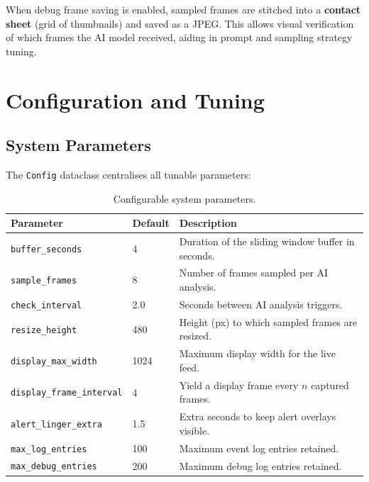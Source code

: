 \documentclass[12pt,a4paper]{article}
\begin{document}
When debug frame saving is enabled, sampled frames are stitched into a \textbf{contact sheet} (grid of thumbnails) and saved as a JPEG. This allows visual verification of which frames the AI model received, aiding in prompt and sampling strategy tuning.

\section{Configuration and Tuning}

\subsection{System Parameters}

The \texttt{Config} dataclass centralises all tunable parameters:

\begin{table}[H]
\centering
\caption{Configurable system parameters.}
\label{tab:config}
\begin{tabular}{@{}llp{6.5cm}@{}}
\toprule
\textbf{Parameter} & \textbf{Default} & \textbf{Description} \\
\midrule
\texttt{buffer\_seconds} & 4 & Duration of the sliding window buffer in seconds. \\
\texttt{sample\_frames} & 8 & Number of frames sampled per AI analysis. \\
\texttt{check\_interval} & 2.0 & Seconds between AI analysis triggers. \\
\texttt{resize\_height} & 480 & Height (px) to which sampled frames are resized. \\
\texttt{display\_max\_width} & 1024 & Maximum display width for the live feed. \\
\texttt{display\_frame\_interval} & 4 & Yield a display frame every $n$ captured frames. \\
\texttt{alert\_linger\_extra} & 1.5 & Extra seconds to keep alert overlays visible. \\
\texttt{max\_log\_entries} & 100 & Maximum event log entries retained. \\
\texttt{max\_debug\_entries} & 200 & Maximum debug log entries retained. \\
\bottomrule
\end{tabular}
\end{table}
\end{document}
